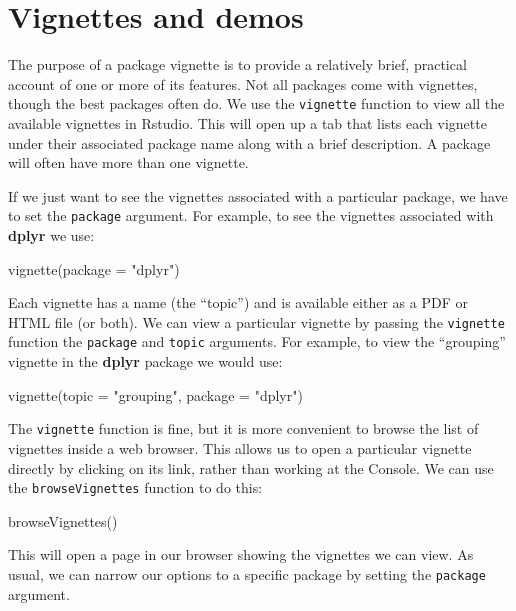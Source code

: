 \documentclass[
]{book}
\newenvironment{Shaded}{\begin{snugshade}}{\end{snugshade}}
\newcommand{\AttributeTok}[1]{\textcolor[rgb]{0.77,0.63,0.00}{#1}}
\newcommand{\FunctionTok}[1]{\textcolor[rgb]{0.00,0.00,0.00}{#1}}
\newcommand{\NormalTok}[1]{#1}
\newcommand{\StringTok}[1]{\textcolor[rgb]{0.31,0.60,0.02}{#1}}
\begin{document}
\hypertarget{vignettes}{%
\section{Vignettes and demos}\label{vignettes}}

The purpose of a package vignette is to provide a relatively brief, practical account of one or more of its features. Not all packages come with vignettes, though the best packages often do. We use the \texttt{vignette} function to view all the available vignettes in Rstudio. This will open up a tab that lists each vignette under their associated package name along with a brief description. A package will often have more than one vignette.

If we just want to see the vignettes associated with a particular package, we have to set the \texttt{package} argument. For example, to see the vignettes associated with \textbf{dplyr} we use:

\begin{Shaded}
\begin{Highlighting}[]
\FunctionTok{vignette}\NormalTok{(}\AttributeTok{package =} \StringTok{"dplyr"}\NormalTok{)}
\end{Highlighting}
\end{Shaded}

Each vignette has a name (the ``topic'') and is available either as a PDF or HTML file (or both). We can view a particular vignette by passing the \texttt{vignette} function the \texttt{package} and \texttt{topic} arguments. For example, to view the ``grouping'' vignette in the \textbf{dplyr} package we would use:

\begin{Shaded}
\begin{Highlighting}[]
\FunctionTok{vignette}\NormalTok{(}\AttributeTok{topic =} \StringTok{"grouping"}\NormalTok{, }\AttributeTok{package =} \StringTok{"dplyr"}\NormalTok{)}
\end{Highlighting}
\end{Shaded}

The \texttt{vignette} function is fine, but it is more convenient to browse the list of vignettes inside a web browser. This allows us to open a particular vignette directly by clicking on its link, rather than working at the Console. We can use the \texttt{browseVignettes} function to do this:

\begin{Shaded}
\begin{Highlighting}[]
\FunctionTok{browseVignettes}\NormalTok{()}
\end{Highlighting}
\end{Shaded}

This will open a page in our browser showing the vignettes we can view. As usual, we can narrow our options to a specific package by setting the \texttt{package} argument.

  
\end{document}
